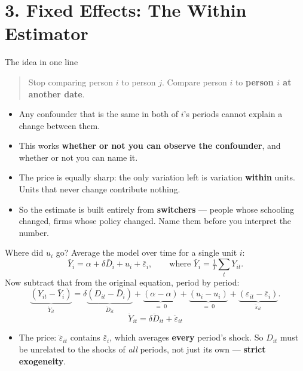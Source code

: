 \documentclass[
  11pt,
  ignorenonframetext,
  aspectratio=169,
]{beamer}
\providecommand{\tightlist}{%
  \setlength{\itemsep}{0pt}\setlength{\parskip}{0pt}}
\begin{document}
\section{3. Fixed Effects: The Within
Estimator}\label{fixed-effects-the-within-estimator}

\begin{frame}{The idea in one line}
\protect{}\label{the-idea-in-one-line}
\begin{quote}
Stop comparing person \(i\) to person \(j\). Compare person \(i\) to
\textbf{person \(i\) at another date}.
\end{quote}

\vspace{0.5em}

\begin{itemize}
\tightlist
\item
  Any confounder that is the same in both of \(i\)'s periods cannot
  explain a change between them.
\item
  This works \textbf{whether or not you can observe the confounder}, and
  whether or not you can name it.
\item
  The price is equally sharp: the only variation left is variation
  \textbf{within} units. Units that never change contribute nothing.
\item
  So the estimate is built entirely from \textbf{switchers} --- people
  whose schooling changed, firms whose policy changed. Name them before
  you interpret the number.
\end{itemize}
\end{frame}

\begin{frame}{Where did \(u_i\) go?}
\protect{}\label{where-did-u_i-go}
Average the model over time for a single unit \(i\): \[
\bar Y_i = \alpha + \delta \bar D_i + u_i + \bar\varepsilon_i,
\qquad \text{where } \bar Y_i = \tfrac{1}{T}\textstyle\sum_t Y_{it} .
\] Now subtract that from the original equation, period by period: \[
\underbrace{(Y_{it} - \bar Y_i)}_{\ddot Y_{it}}
= \delta \underbrace{(D_{it} - \bar D_i)}_{\ddot D_{it}}
+ \underbrace{(\alpha - \alpha)}_{\textstyle = \;0}
+ \underbrace{(u_i - u_i)}_{\textstyle = \;0}
+ \underbrace{(\varepsilon_{it} - \bar\varepsilon_i)}_{\ddot\varepsilon_{it}} .
\] \vspace{-0.2em} \[
\boxed{\;\ddot Y_{it} = \delta \ddot D_{it} + \ddot\varepsilon_{it}\;}
\]

\begin{itemize}
\tightlist
\item
  The price: \(\ddot\varepsilon_{it}\) contains \(\bar\varepsilon_i\),
  which averages \textbf{every} period's shock. So \(D_{it}\) must be
  unrelated to the shocks of \emph{all} periods, not just its own ---
  \textbf{strict exogeneity}.
\end{itemize}
\end{frame}
\end{document}
